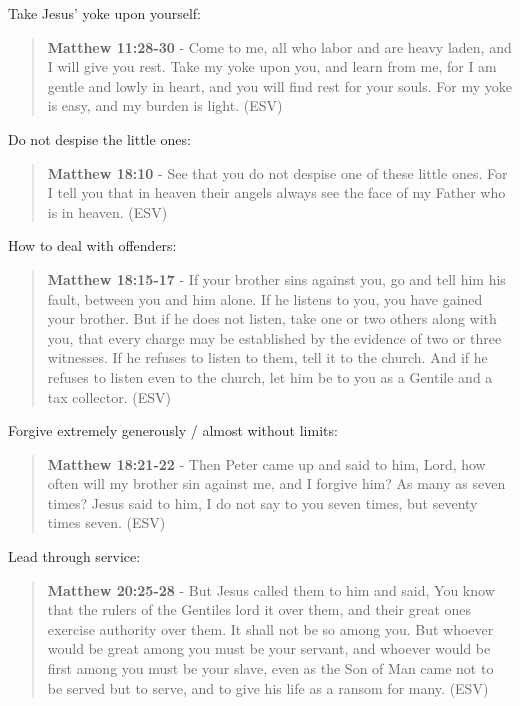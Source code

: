 \documentclass[11pt]{article}
\begin{document}
Take Jesus' yoke upon yourself:

\begin{quote}
\textbf{Matthew 11:28-30} - Come to me, all who labor and are heavy laden, and I will give you rest. Take my yoke upon you, and learn from me, for I am gentle and lowly in heart, and you will find rest for your souls. For my yoke is easy, and my burden is light. (ESV)
\end{quote}

Do not despise the little ones:

\begin{quote}
\textbf{Matthew 18:10} - See that you do not despise one of these little ones. For I tell you that in heaven their angels always see the face of my Father who is in heaven. (ESV)
\end{quote}

How to deal with offenders:

\begin{quote}
\textbf{Matthew 18:15-17} - If your brother sins against you, go and tell him his fault, between you and him alone. If he listens to you, you have gained your brother. But if he does not listen, take one or two others along with you, that every charge may be established by the evidence of two or three witnesses. If he refuses to listen to them, tell it to the church. And if he refuses to listen even to the church, let him be to you as a Gentile and a tax collector. (ESV)
\end{quote}

Forgive extremely generously / almost without limits:

\begin{quote}
\textbf{Matthew 18:21-22} - Then Peter came up and said to him, Lord, how often will my brother sin against me, and I forgive him? As many as seven times? Jesus said to him, I do not say to you seven times, but seventy times seven. (ESV)
\end{quote}

Lead through service:

\begin{quote}
\textbf{Matthew 20:25-28} - But Jesus called them to him and said, You know that the rulers of the Gentiles lord it over them, and their great ones exercise authority over them. It shall not be so among you. But whoever would be great among you must be your servant, and whoever would be first among you must be your slave, even as the Son of Man came not to be served but to serve, and to give his life as a ransom for many. (ESV)
\end{quote}
\end{document}
